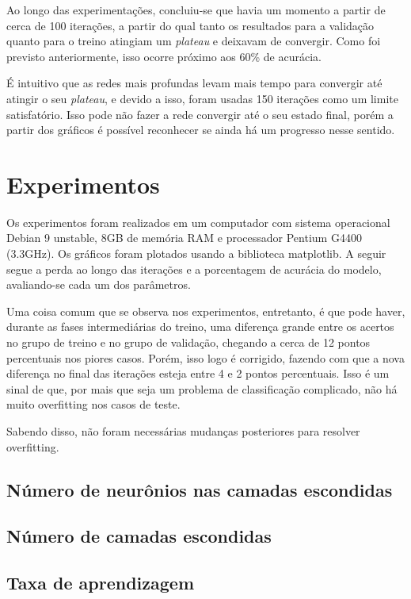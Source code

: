 \documentclass[11pt]{article}
\begin{document}
Ao longo das experimentações, concluiu-se que havia um momento a partir de cerca de 100 iterações, a partir do qual tanto os resultados para a validação quanto para o treino atingiam um \textit{plateau} e deixavam de convergir. Como foi previsto anteriormente, isso ocorre próximo aos 60\% de acurácia.

É intuitivo que as redes mais profundas levam mais tempo para convergir até atingir o seu \textit{plateau}, e devido a isso, foram usadas 150 iterações como um limite satisfatório. Isso pode não fazer a rede convergir até o seu estado final, porém a partir dos gráficos é possível reconhecer se ainda há um progresso nesse sentido.

\section{Experimentos}

Os experimentos foram realizados em um computador com sistema operacional Debian 9 unstable, 8GB de memória RAM e processador Pentium G4400 (3.3GHz). Os gráficos foram plotados usando a biblioteca matplotlib. A seguir segue a perda ao longo das iterações e a porcentagem de acurácia do modelo, avaliando-se cada um dos parâmetros.

Uma coisa comum que se observa nos experimentos, entretanto, é que pode haver, durante as fases intermediárias do treino, uma diferença grande entre os acertos no grupo de treino e no grupo de validação, chegando a cerca de 12 pontos percentuais nos piores casos. Porém, isso logo é corrigido, fazendo com que a nova diferença no final das iterações esteja entre 4 e 2 pontos percentuais. Isso é um sinal de que, por mais que seja um problema de classificação complicado, não há muito overfitting nos casos de teste.

Sabendo disso, não foram necessárias mudanças posteriores para resolver overfitting.

\subsection*{Número de neurônios nas camadas escondidas}

\subsection*{Número de camadas escondidas}

\subsection*{Taxa de aprendizagem}
\end{document}

